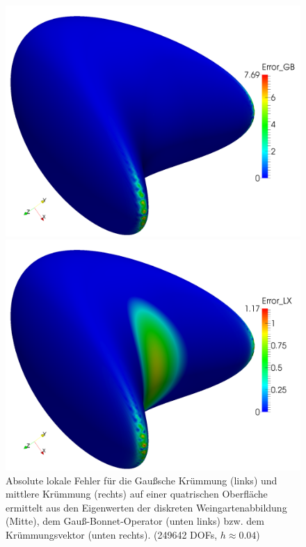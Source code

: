 \begin{figure}
\begin{minipage}[t]{0.49\textwidth}
       \centering\includegraphics[width=\textwidth]{bilder/Curvature/heineB/GB250k.png}
    \end{minipage}\hfill
    \begin{minipage}[t]{0.49\textwidth}
       \centering\includegraphics[width=\textwidth]{bilder/Curvature/heineB/LX250k.png}
    \end{minipage}
    \caption[Fehler (Krümmungen auf quatrischer Oberfläche)]
            {Absolute lokale Fehler für die Gaußsche Krümmung (links) und mittlere Krümmung (rechts) auf
            einer quatrischen Oberfläche
             ermittelt aus den Eigenwerten der diskreten Weingartenabbildung (Mitte), dem
             Gauß-Bonnet-Operator (unten links) bzw. dem Krümmungsvektor (unten rechts).
             (249642 DOFs, \( h\approx0.04 \))}
    \label{figErrCurvHeineB}
  \end{figure}

